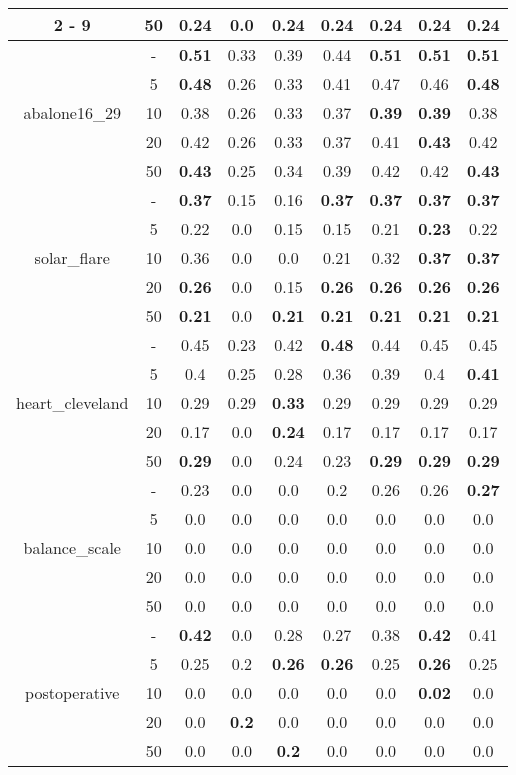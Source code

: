 \documentclass{article}%
\begin{document}
\begin{longtable}{c|c|ccccccc}
\cline{2%
-%
9}%
&50&\textbf{0.24}&0.0&\textbf{0.24}&\textbf{0.24}&\textbf{0.24}&\textbf{0.24}&\textbf{0.24}\\%
\hline%
\multirow{5}{*}{abalone16\_29}&{-}&\textbf{0.51}&0.33&0.39&0.44&\textbf{0.51}&\textbf{0.51}&\textbf{0.51}\\%
\cline{2%
-%
9}%
&5&\textbf{0.48}&0.26&0.33&0.41&0.47&0.46&\textbf{0.48}\\%
\cline{2%
-%
9}%
&10&0.38&0.26&0.33&0.37&\textbf{0.39}&\textbf{0.39}&0.38\\%
\cline{2%
-%
9}%
&20&0.42&0.26&0.33&0.37&0.41&\textbf{0.43}&0.42\\%
\cline{2%
-%
9}%
&50&\textbf{0.43}&0.25&0.34&0.39&0.42&0.42&\textbf{0.43}\\%
\hline%
\multirow{5}{*}{solar\_flare}&{-}&\textbf{0.37}&0.15&0.16&\textbf{0.37}&\textbf{0.37}&\textbf{0.37}&\textbf{0.37}\\%
\cline{2%
-%
9}%
&5&0.22&0.0&0.15&0.15&0.21&\textbf{0.23}&0.22\\%
\cline{2%
-%
9}%
&10&0.36&0.0&0.0&0.21&0.32&\textbf{0.37}&\textbf{0.37}\\%
\cline{2%
-%
9}%
&20&\textbf{0.26}&0.0&0.15&\textbf{0.26}&\textbf{0.26}&\textbf{0.26}&\textbf{0.26}\\%
\cline{2%
-%
9}%
&50&\textbf{0.21}&0.0&\textbf{0.21}&\textbf{0.21}&\textbf{0.21}&\textbf{0.21}&\textbf{0.21}\\%
\hline%
\multirow{5}{*}{heart\_cleveland}&{-}&0.45&0.23&0.42&\textbf{0.48}&0.44&0.45&0.45\\%
\cline{2%
-%
9}%
&5&0.4&0.25&0.28&0.36&0.39&0.4&\textbf{0.41}\\%
\cline{2%
-%
9}%
&10&0.29&0.29&\textbf{0.33}&0.29&0.29&0.29&0.29\\%
\cline{2%
-%
9}%
&20&0.17&0.0&\textbf{0.24}&0.17&0.17&0.17&0.17\\%
\cline{2%
-%
9}%
&50&\textbf{0.29}&0.0&0.24&0.23&\textbf{0.29}&\textbf{0.29}&\textbf{0.29}\\%
\hline%
\multirow{5}{*}{balance\_scale}&{-}&0.23&0.0&0.0&0.2&0.26&0.26&\textbf{0.27}\\%
\cline{2%
-%
9}%
&5&0.0&0.0&0.0&0.0&0.0&0.0&0.0\\%
\cline{2%
-%
9}%
&10&0.0&0.0&0.0&0.0&0.0&0.0&0.0\\%
\cline{2%
-%
9}%
&20&0.0&0.0&0.0&0.0&0.0&0.0&0.0\\%
\cline{2%
-%
9}%
&50&0.0&0.0&0.0&0.0&0.0&0.0&0.0\\%
\hline%
\multirow{5}{*}{postoperative}&{-}&\textbf{0.42}&0.0&0.28&0.27&0.38&\textbf{0.42}&0.41\\%
\cline{2%
-%
9}%
&5&0.25&0.2&\textbf{0.26}&\textbf{0.26}&0.25&\textbf{0.26}&0.25\\%
\cline{2%
-%
9}%
&10&0.0&0.0&0.0&0.0&0.0&\textbf{0.02}&0.0\\%
\cline{2%
-%
9}%
&20&0.0&\textbf{0.2}&0.0&0.0&0.0&0.0&0.0\\%
\cline{2%
-%
9}%
&50&0.0&0.0&\textbf{0.2}&0.0&0.0&0.0&0.0\\%
\hline%
\end{longtable}

%
\end{document}
